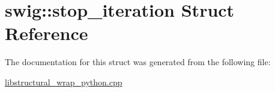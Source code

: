 \hypertarget{structswig_1_1stop__iteration}{}\section{swig\+:\+:stop\+\_\+iteration Struct Reference}
\label{structswig_1_1stop__iteration}


The documentation for this struct was generated from the following file\+:\begin{DoxyCompactItemize}
\item 
\hyperlink{libstructural__wrap__python_8cpp}{libstructural\+\_\+wrap\+\_\+python.\+cpp}\end{DoxyCompactItemize}
